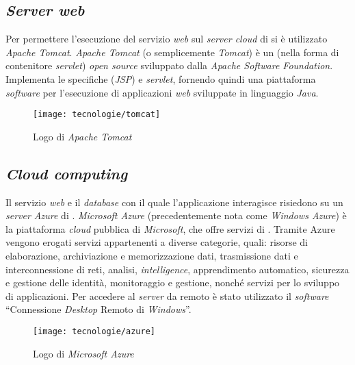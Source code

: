 \newpage

\subsection{\textit{Server web}}

Per permettere l'esecuzione del servizio \textit{web} sul \textit{server cloud} di \visione{} si è utilizzato \textit{Apache Tomcat}. \textit{Apache Tomcat} (o semplicemente \textit{Tomcat}) è un  (nella forma di contenitore \textit{servlet}) \textit{open source} sviluppato dalla \textit{Apache Software Foundation}. Implementa le specifiche  (\textit{JSP}) e \textit{servlet}, fornendo quindi una piattaforma \textit{software} per l'esecuzione di applicazioni \textit{web} sviluppate in linguaggio \textit{Java}.

\begin{figure}[!h] 
    \centering 
    \texttt{[image: tecnologie/tomcat]} 
    \caption{Logo di \textit{Apache Tomcat}}
\end{figure}

\subsection{\textit{Cloud computing}}

Il servizio \textit{web} e il \textit{database} con il quale l'applicazione interagisce risiedono su un \textit{server Azure} di \visione{}. \textit{Microsoft Azure} (precedentemente nota come \textit{Windows Azure}) è la piattaforma \textit{cloud} pubblica di \textit{Microsoft}, che offre servizi di . Tramite Azure vengono erogati servizi appartenenti a diverse categorie, quali: risorse di elaborazione, archiviazione e memorizzazione dati, trasmissione dati e interconnessione di reti, analisi, \textit{intelligence}, apprendimento automatico, sicurezza e gestione delle identità, monitoraggio e gestione, nonché servizi per lo sviluppo di applicazioni. Per accedere al \textit{server} da remoto è stato utilizzato il \textit{software} ``Connessione \textit{Desktop} Remoto di \textit{Windows}''.

\begin{figure}[!h] 
    \centering 
    \texttt{[image: tecnologie/azure]} 
    \caption{Logo di \textit{Microsoft Azure}}
\end{figure}

\newpage


